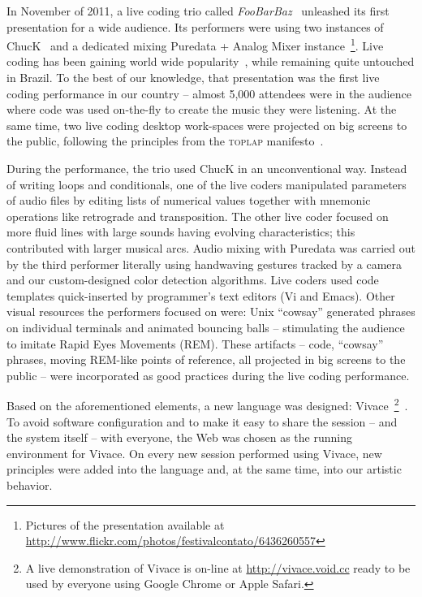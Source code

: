 \documentclass[letterpaper, 12pt]{article}
\begin{document}
{In November of 2011, a live coding trio called
\textit{FooBarBaz}~\citep{foobarbaz} unleashed its first presentation
for a wide audience. Its performers were using two instances of
ChucK~\citep{wang2003chuck} and a dedicated mixing Puredata + Analog
Mixer instance~\footnote{Pictures of the presentation available at
  \url{http://www.flickr.com/photos/festivalcontato/6436260557}}. Live
coding has been gaining world wide popularity~\citep{nilson2007live,
  collins2003live, brown2007a, collins2011live}, while remaining quite
untouched in Brazil. To the best of our knowledge, that presentation
was the first live coding performance in our country -- almost 5,000
attendees were in the audience where code was used on-the-fly to
create the music they were listening. At the same time, two live
coding desktop work-spaces were projected on big screens to the
public, following the principles from the \textsc{toplap}
manifesto~\citep{ward2004live}.

During the performance, the trio used ChucK in an unconventional
way. Instead of writing loops and conditionals, one of the live coders
manipulated parameters of audio files by editing lists of numerical
values together with mnemonic operations like retrograde and
transposition.  The other live coder focused on more fluid lines with
large sounds having evolving characteristics; this contributed with
larger musical arcs.  Audio mixing with Puredata was carried out by
the third performer literally using handwaving gestures tracked by a
camera and our custom-designed color detection algorithms. Live coders
used code templates quick-inserted by programmer's text editors (Vi
and Emacs). Other visual resources the performers focused on were:
Unix ``cowsay'' generated phrases on individual terminals and animated
bouncing balls -- stimulating the audience to imitate Rapid Eyes
Movements (REM). These artifacts -- code, ``cowsay'' phrases, moving
REM-like points of reference, all projected in big screens to the
public -- were incorporated as good practices during the live coding
performance.

Based on the aforementioned elements, a new language was designed:
Vivace~\footnote{A live demonstration of Vivace is on-line at
  \url{http://vivace.void.cc} ready to be used by everyone using
  Google Chrome or Apple Safari.}~\citep{Vivace}.  To avoid software
configuration and to make it easy to share the session -- and the
system itself -- with everyone, the Web was chosen as the running
environment for Vivace. On every new session performed using Vivace,
new principles were added into the language and, at the same time,
into our artistic behavior.

}
\end{document}
